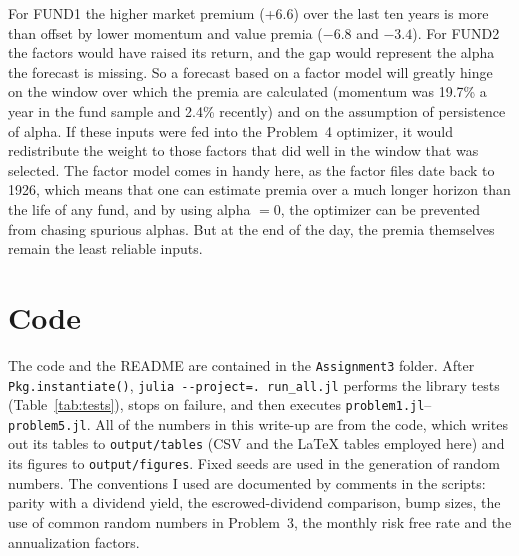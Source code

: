 \documentclass[11pt]{article}
\newcommand{\tbl}[1]{}
\begin{document}
\begin{table}[H]
\centering\small
\caption{From realized excess return (fund sample) to the forecast without alpha, \% a year.}
\resizebox{\textwidth}{!}{\tbl{p5_h_decomp}}
\end{table}

For FUND1 the higher market premium (+6.6) over the last ten years is more than offset by lower momentum and value premia ($-6.8$ and $-3.4$). For FUND2 the factors would have raised its return, and the gap would represent the alpha the forecast is missing. So a forecast based on a factor model will greatly hinge on the window over which the premia are calculated (momentum was 19.7\% a year in the fund sample and 2.4\% recently) and on the assumption of persistence of alpha. If these inputs were fed into the Problem~4 optimizer, it would redistribute the weight to those factors that did well in the window that was selected. The factor model comes in handy here, as the factor files date back to 1926, which means that one can estimate premia over a much longer horizon than the life of any fund, and by using alpha $=0$, the optimizer can be prevented from chasing spurious alphas. But at the end of the day, the premia themselves remain the least reliable inputs.

\section{Code}

The code and the README are contained in the \texttt{Assignment3} folder. After \texttt{Pkg.instantiate()}, \texttt{julia -{}-project=. run\_all.jl} performs the library tests (Table~\ref{tab:tests}), stops on failure, and then executes \texttt{problem1.jl}--\texttt{problem5.jl}. All of the numbers in this write-up are from the code, which writes out its tables to \texttt{output/tables} (CSV and the LaTeX tables employed here) and its figures to \texttt{output/figures}. Fixed seeds are used in the generation of random numbers. The conventions I used are documented by comments in the scripts: parity with a dividend yield, the escrowed-dividend comparison, bump sizes, the use of common random numbers in Problem~3, the monthly risk free rate and the annualization factors.



\end{document}

